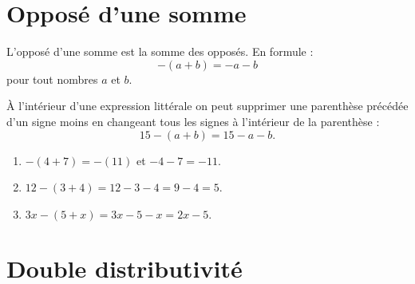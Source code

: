 
\section{Opposé d'une somme}



\begin{Aretenir}
    L'opposé d'une somme est la somme des opposés. En formule :
    \begin{equation}
        -(a+b)=-a-b
    \end{equation}
    pour tout nombres \( a\) et \( b\).

    À l'intérieur d'une expression littérale on peut supprimer une parenthèse précédée d'un signe moins en changeant tous les signes à l'intérieur de la parenthèse :
    \begin{equation}
        15-(a+b)=15-a-b.
    \end{equation}
\end{Aretenir}

\begin{example}
    \begin{enumerate}
        \item
            \( -(4+7)=-(11)\) et \( -4-7=-11\).
        \item
            \( 12-(3+4)=12-3-4=9-4=5\).
        \item
            \( 3x-(5+x)=3x-5-x=2x-5\).
    \end{enumerate}
\end{example}

\section{Double distributivité}



